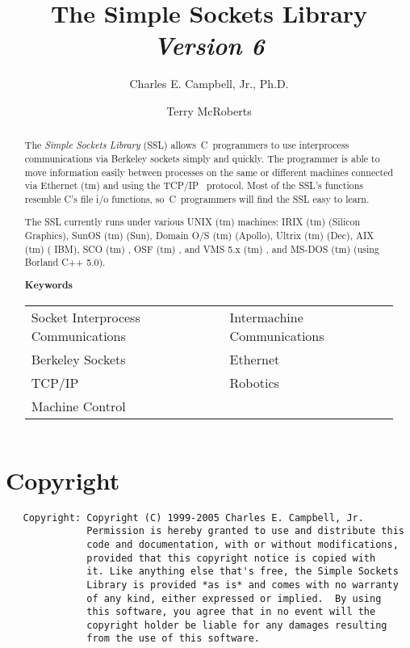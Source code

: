 \documentclass[12pt]{article}
\title{\textbf{The Simple Sockets Library \\ \normalsize\em Version 6}}
\author{Charles E. Campbell, Jr., {\normalsize Ph.D.} \and Terry McRoberts}
\def\SSL{{\small SSL}}
\def\TCP{{\small TCP/IP }}
\def\TradeMark{{\tiny (tm) }}
\renewcommand{\thepage}{}
\begin{document}
\maketitle

\begin{abstract}
{
The {\em Simple Sockets Library} (\SSL) allows~C~programmers to use
interprocess communications via Berkeley sockets simply and quickly.
The programmer is able to move information easily between processes
on the same or different machines connected via Ethernet \TradeMark and using
the \TCP\ protocol.  Most of the \SSL's functions resemble C's file i/o
functions, so~C~programmers will find the {\SSL} easy to learn.
\vspace{1ex}

The {\SSL} currently runs under various {\small UNIX \TradeMark} machines:
{\small IRIX \TradeMark} (Silicon Graphics), SunOS \TradeMark (Sun), Domain O/S
\TradeMark (Apollo), Ultrix \TradeMark (Dec), {\small AIX \TradeMark} ({\small
IBM}), {\small SCO \TradeMark}, {\small OSF \TradeMark}, and {\small VMS} 5.x
\TradeMark, and {\small MS-DOS \TradeMark} (using Borland C++ 5.0).
}

\vspace{.25in}
\begin{table}[h]
  \begin{center}
  \small
  {\bf Keywords}   \footnotesize
  \begin{tabular}{ll}
    Socket Interprocess Communications  & Intermachine Communications \\
    Berkeley Sockets                    & Ethernet                    \\
    {\TCP}                                & Robotics                    \\
    Machine Control                     &
  \end{tabular}
  \end{center}
\end{table}

\end{abstract}

\titlepage
\tableofcontents
\newpage
\setcounter{page}{1}
\renewcommand{\thepage}{\arabic{page}}

\section{Copyright}
    \begin{verbatim}
   Copyright: Copyright (C) 1999-2005 Charles E. Campbell, Jr.
              Permission is hereby granted to use and distribute this
              code and documentation, with or without modifications,
              provided that this copyright notice is copied with
              it. Like anything else that's free, the Simple Sockets
              Library is provided *as is* and comes with no warranty
              of any kind, either expressed or implied.  By using
              this software, you agree that in no event will the
              copyright holder be liable for any damages resulting
              from the use of this software.
    \end{verbatim}
\end{document}
